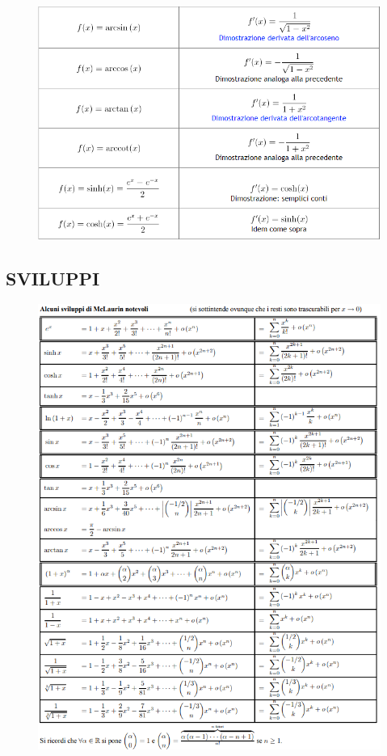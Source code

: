 \documentclass[a4paper, 9pt]{report}
\begin{document}
\newpage
\begin{figure}[h!]
    \includegraphics[width=\linewidth]{../dim/derivate2.PNG}
\end{figure}
\newpage
\subsection*{SVILUPPI}
\begin{figure}[h!]
    \includegraphics[width=\linewidth]{../dim/mclaurin.PNG}
\end{figure}
\end{document}
